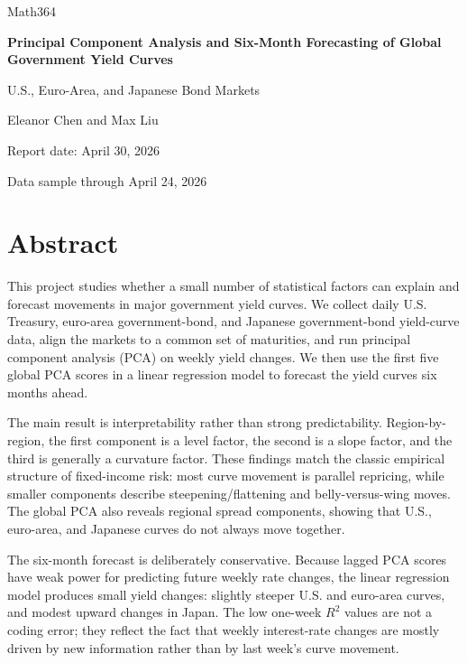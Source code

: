 \documentclass[11pt]{article}
\begin{document}

\begin{titlepage}
\centering
\vspace*{1.25in}
{\Large Math364\par}
\vspace{0.55in}
{\huge\bfseries Principal Component Analysis and Six-Month Forecasting of Global Government Yield Curves\par}
\vspace{0.45in}
{\Large U.S., Euro-Area, and Japanese Bond Markets\par}
\vspace{0.85in}
{\large Eleanor Chen \quad and \quad Max Liu\par}
\vfill
{\large Report date: April 30, 2026\par}
\vspace{0.2in}
{\large Data sample through April 24, 2026\par}
\end{titlepage}

\section*{Abstract}

This project studies whether a small number of statistical factors can explain and forecast movements in major government yield curves. We collect daily U.S. Treasury, euro-area government-bond, and Japanese government-bond yield-curve data, align the markets to a common set of maturities, and run principal component analysis (PCA) on weekly yield changes. We then use the first five global PCA scores in a linear regression model to forecast the yield curves six months ahead.

The main result is interpretability rather than strong predictability. Region-by-region, the first component is a level factor, the second is a slope factor, and the third is generally a curvature factor. These findings match the classic empirical structure of fixed-income risk: most curve movement is parallel repricing, while smaller components describe steepening/flattening and belly-versus-wing moves. The global PCA also reveals regional spread components, showing that U.S., euro-area, and Japanese curves do not always move together.

The six-month forecast is deliberately conservative. Because lagged PCA scores have weak power for predicting future weekly rate changes, the linear regression model produces small yield changes: slightly steeper U.S. and euro-area curves, and modest upward changes in Japan. The low one-week $R^2$ values are not a coding error; they reflect the fact that weekly interest-rate changes are mostly driven by new information rather than by last week's curve movement.
\end{document}
